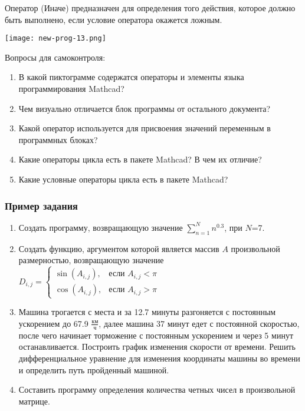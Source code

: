 Оператор  (Иначе) предназначен для определения того действия, которое должно быть выполнено, если условие оператора  окажется ложным.


\begin{center}
	\texttt{[image: new-prog-13.png]}
\end{center}


Вопросы для самоконтроля:
\begin{enumerate}
	\item В какой пиктограмме содержатся операторы и элементы языка программирования Mathcad?
	\item Чем визуально отличается блок программы от остального документа?
	\item Какой оператор используется для присвоения значений переменным в программных блоках?
	\item Какие операторы цикла есть в пакете Mathcad? В чем их отличие?
	\item Какие условные операторы цикла есть в пакете Mathcad?
\end{enumerate}

\subsubsection*{Пример задания}
\begin{enumerate}
	\item  Создать программу, возвращающую значение $\sum\limits_{n=1}^{N} {n}^{0.3}$, при $N$=7. 
	\item Создать функцию, аргументом которой является массив $A$ произвольной размерностью, возвращающую значение \\ $D_{i,j}=\begin{cases} \sin(A_{i,j}), & \text{если } A_{i,j}<\pi \\ \cos(A_{i,j}), & \text{если } A_{i,j}>\pi \end{cases}                     $ 
	\item Машина трогается с места и за 12.7 минуты разгоняется с постоянным ускорением до 67.9 ${\frac{км}{ч}}$, далее машина   37 минут едет с постоянной скоростью, после чего начинает торможение с постоянным ускорением и через   5 минут останавливается. Построить график изменения скорости от времени. Решить дифференциальное уравнение для изменения координаты машины во времени и определить путь пройденный машиной. 
	\item Составить программу определения количества четных чисел в произвольной матрице.                                                                                                                                                                
	
\end{enumerate}